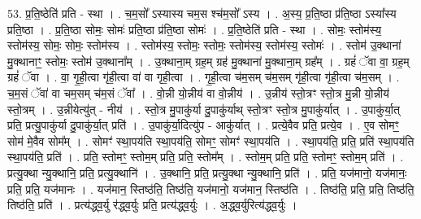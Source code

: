 \documentclass[17pt]{extarticle}
\begin{document}
53. प्र॒ति॒ष्ठेति॑ प्रति - स्था । . च॒म॒सो᳚ ऽस्यास्य चम॒स श्च॑म॒सो᳚ ऽस्य । . अ॒स्य॒ प्र॒ति॒ष्ठा प्र॑ति॒ष्ठा ऽस्या᳚स्य प्रति॒ष्ठा । . प्र॒ति॒ष्ठा सोमः॒ सोमः॑ प्रति॒ष्ठा प्र॑ति॒ष्ठा सोमः॑ । . प्र॒ति॒ष्ठेति॑ प्रति - स्था । . सोमः॒ स्तोम॑स्य॒ स्तोम॑स्य॒ सोमः॒ सोमः॒ स्तोम॑स्य । . स्तोम॑स्य॒ स्तोमः॒ स्तोमः॒ स्तोम॑स्य॒ स्तोम॑स्य॒ स्तोमः॑ । . स्तोम॑ उ॒क्थाना॑ मु॒क्थानाꣳ॒॒ स्तोमः॒ स्तोम॑ उ॒क्थाना᳚म् । . उ॒क्थाना॒म् ग्रह॒म् ग्रह॑ मु॒क्थाना॑ मु॒क्थाना॒म् ग्रह᳚म् । . ग्रहं॑ ॅवा वा॒ ग्रह॒म् ग्रहं॑ ॅवा । . वा॒ गृ॒ही॒त्वा गृ॑ही॒त्वा वा॑ वा गृही॒त्वा । . गृ॒ही॒त्वा च॑म॒सम् च॑म॒सम् गृ॑ही॒त्वा गृ॑ही॒त्वा च॑म॒सम् । . च॒म॒सं ॅवा॑ वा चम॒सम् च॑म॒सं ॅवा᳚ । . वो॒न्नी यो॒न्नीय॑ वा वो॒न्नीय॑ । . उ॒न्नीय॑ स्तो॒त्रꣳ स्तो॒त्र मु॒न्नी यो॒न्नीय॑ स्तो॒त्रम् । . उ॒न्नीयेत्यु॑त् - नीय॑ । . स्तो॒त्र मु॒पाकु॑र्या दु॒पाकु॑र्याथ् स्तो॒त्रꣳ स्तो॒त्र मु॒पाकु॑र्यात् । . उ॒पाकु॑र्या॒त् प्रति॒ प्रत्यु॒पाकु॑र्या दु॒पाकु॑र्या॒त् प्रति॑ । . उ॒पाकु॑र्या॒दित्यु॑प - आकु॑र्यात् । . प्रत्ये॒वैव प्रति॒ प्रत्ये॒व । . ए॒व सोमꣳ॒॒ सोम॑ मे॒वैव सोम᳚म् । . सोमꣳ॑ स्था॒पय॑ति स्था॒पय॑ति॒ सोमꣳ॒॒ सोमꣳ॑ स्था॒पय॑ति । . स्था॒पय॑ति॒ प्रति॒ प्रति॑ स्था॒पय॑ति स्था॒पय॑ति॒ प्रति॑ । . प्रति॒ स्तोमꣳ॒॒ स्तोम॒म् प्रति॒ प्रति॒ स्तोम᳚म् । . स्तोम॒म् प्रति॒ प्रति॒ स्तोमꣳ॒॒ स्तोम॒म् प्रति॑ । . प्रत्यु॒क्था न्यु॒क्थानि॒ प्रति॒ प्रत्यु॒क्थानि॑ । . उ॒क्थानि॒ प्रति॒ प्रत्यु॒क्था न्यु॒क्थानि॒ प्रति॑ । . प्रति॒ यज॑मानो॒ यज॑मानः॒ प्रति॒ प्रति॒ यज॑मानः । . यज॑मान॒ स्तिष्ठ॑ति॒ तिष्ठ॑ति॒ यज॑मानो॒ यज॑मान॒ स्तिष्ठ॑ति । . तिष्ठ॑ति॒ प्रति॒ प्रति॒ तिष्ठ॑ति॒ तिष्ठ॑ति॒ प्रति॑ । . प्रत्य॑द्ध्व॒र्यु र॑द्ध्व॒र्युः प्रति॒ प्रत्य॑द्ध्व॒र्युः । . अ॒द्ध्व॒र्युरित्य॑द्ध्व॒र्युः । \newline
\end{document}
